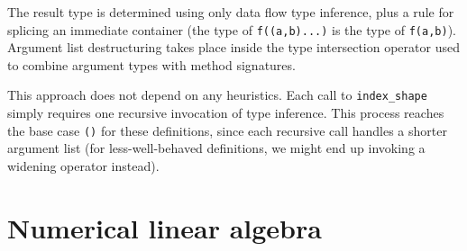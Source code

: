 The result type is determined using only data flow type inference, plus a
rule for splicing an immediate container (the type of \texttt{f((a,b)...)} is
the type of \texttt{f(a,b)}). Argument list destructuring takes place inside
the type intersection operator used to combine argument types with method
signatures.

This approach does not depend on any heuristics. Each call to \texttt{index\_shape}
simply requires one recursive invocation of type inference. This process reaches
the base case \texttt{()} for these definitions, since each recursive call
handles a shorter argument list (for less-well-behaved definitions, we might
end up invoking a widening operator instead).



\iffalse
\section{Array views}

tim holy in issue 8839:

``without staged functions in my initial post in 8235. The take-home message: generating all methods through dimension 8 resulted in more than 5000 separate methods, and required over 4 minutes of parsing \& lowering time (i.e., a 4-minute delay while compiling julia). By comparison, the stagedfunction implementation loads in a snap, and of course can go even beyond 8 dimensions.''
\fi

\section{Numerical linear algebra}
\label{sec:linalg}


